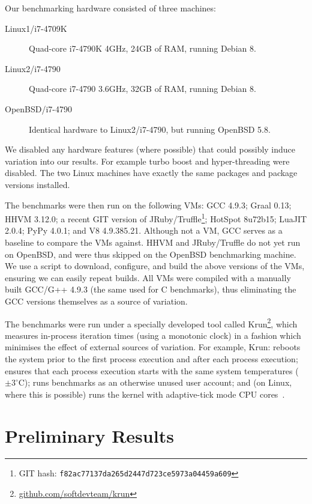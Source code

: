 \documentclass[preprint]{sigplanconf}
\newcommand{\krun}{Krun\xspace}
\newcommand{\bencherthree}{Linux1/i7-4709K\xspace}
\newcommand{\bencherfive}{Linux2/i7-4790\xspace}
\newcommand{\benchersix}{OpenBSD/i7-4790\xspace}
\begin{document}
Our benchmarking hardware consisted of three machines:

\begin{description}
\item[\bencherthree] Quad-core i7-4790K 4GHz, 24GB of RAM, running Debian 8.
\item[\bencherfive] Quad-core i7-4790 3.6GHz, 32GB of RAM, running Debian 8.
\item[\benchersix] Identical hardware to \bencherfive, but running OpenBSD 5.8.
\end{description}

\noindent We disabled any hardware features (where possible) that could
possibly induce variation into our results. For example turbo boost and
hyper-threading were disabled. The two Linux machines have exactly the same
packages and package versions installed.

The benchmarks were then run on the following VMs: GCC 4.9.3; Graal 0.13;
HHVM 3.12.0; a recent GIT version of JRuby/Truffle\footnote{GIT
hash: \texttt{f82ac77137da265d2447d723ce5973a04459a609}}; HotSpot 8u72b15;
LuaJIT 2.0.4; PyPy 4.0.1; and V8 4.9.385.21. Although not a VM, GCC serves as a
baseline to compare the VMs against. HHVM and JRuby/Truffle do not yet run on
OpenBSD, and were thus skipped on the OpenBSD benchmarking machine.
We use a script to download, configure, and build the above
versions of the VMs, ensuring we can easily repeat builds. All VMs were
compiled with a manually built GCC/G++ 4.9.3 (the same used for C benchmarks),
thus eliminating the GCC versions themselves as a source of variation.

The benchmarks were run under a specially developed tool called
\krun\footnote{\url{github.com/softdevteam/krun}}, which
measures in-process iteration times (using a monotonic clock) in a
fashion which minimises the effect of external sources of variation. For example,
\krun: reboots the system prior to the first process execution
and after each process execution; ensures that each process execution starts
with the same system temperatures ($\pm 3^\circ$C); runs benchmarks
as an otherwise unused user
account; and (on Linux, where this is possible) runs the kernel with
adaptive-tick mode CPU cores~\cite{tickless}.

\section{Preliminary Results}
\label{sec:Results}
\end{document}
